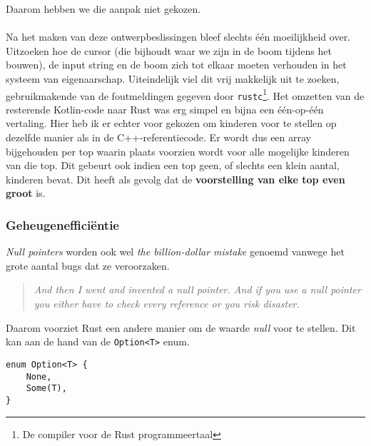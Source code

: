 Daarom hebben we die aanpak niet gekozen.
\\ \\
Na het maken van deze ontwerpbeslissingen bleef slechts één moeilijkheid over.
Uitzoeken hoe de cursor (die bijhoudt waar we zijn in de boom tijdens het bouwen), de input string en de boom zich tot elkaar moeten verhouden in het systeem van eigenaarschap.
Uiteindelijk viel dit vrij makkelijk uit te zoeken, gebruikmakende van de foutmeldingen gegeven door \texttt{rustc}\footnote{De compiler voor de Rust programmeertaal}.
Het omzetten van de resterende Kotlin-code naar Rust was erg simpel en bijna een één-op-één vertaling.
Hier heb ik er echter voor gekozen om kinderen voor te stellen op dezelfde manier als in de C++-referentiecode.
Er wordt dus een array bijgehouden per top waarin plaats voorzien wordt voor alle mogelijke kinderen van die top.
Dit gebeurt ook indien een top geen, of slechts een klein aantal, kinderen bevat.
Dit heeft als gevolg dat de \textbf{voorstelling van elke top even groot} is.

\subsubsection{Geheugenefficiëntie}
\textit{Null pointers} worden ook wel \textit{the billion-dollar mistake} genoemd vanwege het grote aantal bugs dat ze veroorzaken.
\begin{quote}
    \textit{And then I went and invented a null pointer.
    And if you use a null pointer you either have to check every reference or you risk disaster. \cite{null_mistake}}
\end{quote}
Daarom voorziet Rust een andere manier om de waarde \textit{null} voor te stellen.
Dit kan aan de hand van de \texttt{Option<T>} enum.

\begin{verbatim}
enum Option<T> {
    None,
    Some(T),
}
\end{verbatim}


